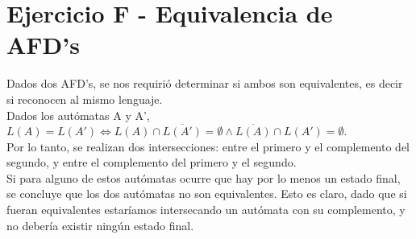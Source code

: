 \section{Ejercicio F - Equivalencia de AFD's}
\indent \indent Dados dos AFD's, se nos requirió determinar si ambos son equivalentes, es decir si reconocen al mismo lenguaje.\\
\indent Dados los autómatas A y A', $L(A) = L(A') \Leftrightarrow L(A) \cap \overline{L(A')} = \emptyset \land \overline{L(A)} \cap L(A') = \emptyset$.\\
Por lo tanto, se realizan dos intersecciones: entre el primero y el complemento del segundo, y entre el complemento del primero y el segundo.\\
Si para alguno de estos autómatas ocurre que hay por lo menos un estado final, se concluye que los dos autómatas no son equivalentes. Esto es claro, dado que si fueran equivalentes estaríamos intersecando un autómata con su complemento, y no debería existir ningún estado final.\\
